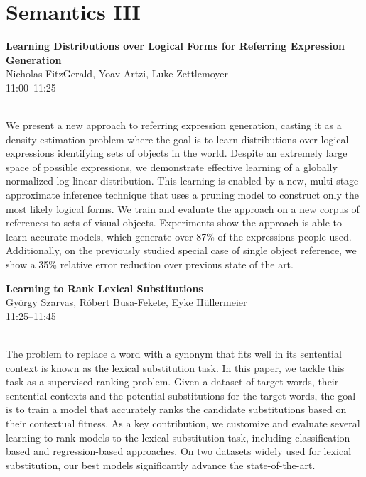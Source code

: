 \documentclass[twoside,makeidx]{book}
\begin{document}
\section{Semantics III}
\vspace{-1em}
\par\vspace{2em}\noindent%
\begin{minipage}{\linewidth}%
\begin{center}
\textbf{\normalsize Learning Distributions over Logical Forms for Referring Expression Generation}\\
\normalsize  Nicholas FitzGerald,  Yoav Artzi,  Luke Zettlemoyer\\
{\small 11:00--11:25}\\
\end{center}
\end{minipage}\\[0.5em]
\nopagebreak%
\noindent%
{\small We present a new approach to referring expression generation, casting it as a density estimation problem where the goal is to learn distributions over logical expressions identifying sets of objects in the world. Despite an extremely large space of possible expressions, we demonstrate effective learning of a globally normalized log-linear distribution. This learning is enabled by a new, multi-stage approximate inference technique that uses a pruning model to construct only the most likely logical forms. We train and evaluate the approach on a new corpus of references to sets of visual objects. Experiments show the approach is able to learn accurate models, which generate over 87\% of the expressions people used. Additionally, on the previously studied special case of single object reference, we show a 35\% relative error reduction over previous state of the art.}
\par\vspace{2em}\noindent%
\begin{minipage}{\linewidth}%
\begin{center}
\textbf{\normalsize Learning to Rank Lexical Substitutions}\\
\normalsize  Gy\"{o}rgy Szarvas,  R\'{o}bert Busa-Fekete,  Eyke H\"{u}llermeier\\
{\small 11:25--11:45}\\
\end{center}
\end{minipage}\\[0.5em]
\nopagebreak%
\noindent%
{\small The problem to replace a word with a synonym that fits well in its sentential context is known as the lexical substitution task. In this paper, we tackle this task as a supervised ranking problem. Given a dataset of target words, their sentential contexts and the potential substitutions for the target words, the goal is to train a model that accurately ranks the candidate substitutions based on their contextual fitness. As a key contribution, we customize and evaluate several learning-to-rank models to the lexical substitution task, including classification-based and regression-based approaches. On two datasets widely used for lexical substitution, our best models significantly advance the state-of-the-art.}
\clearpage
\end{document}
